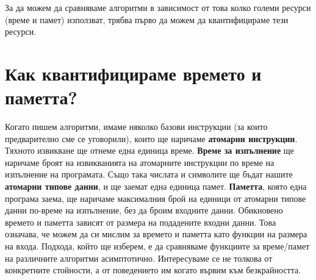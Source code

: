 \documentclass{article}
\theoremstyle{definition}
\theoremstyle{plain}
\theoremstyle{remark}
\theoremstyle{definition}
\begin{document}
За да можем да сравняваме алгоритми в зависимост от това колко големи ресурси (време и памет) използват, трябва първо да можем да квантифицираме тези ресурси.

\section*{Как квантифицираме времето и паметта?}

Когато пишем алгоритми, имаме няколко базови инструкции (за които предварително сме се уговорили), които ще наричаме \textbf{атомарни инструкции}.
Тяхното извикване ще отнеме една единица време.
\textbf{Време за изпълнение} ще наричаме броят на извикванията на атомарните инструкции по време на изпълнение на програмата.
Също така числата и символите ще бъдат нашите \textbf{атомарни типове данни}, и ще заемат една единица памет.
\textbf{Паметта}, която една програма заема, ще наричаме максималния брой на единици от атомарни типове данни по-време на изпълнение, без да броим входните данни.
Обикновено времето и паметта зависят от размера на подадените входни данни.
Това означава, че можем да си мислим за времето и паметта като функции на размера на входа.
Подхода, който ще изберем, е да сравняваме функциите за време/памет на различните алгоритми асимптотично.
Интересуваме се не толкова от конкретните стойности, а от поведението им когато вървим към безкрайността.
\end{document}
